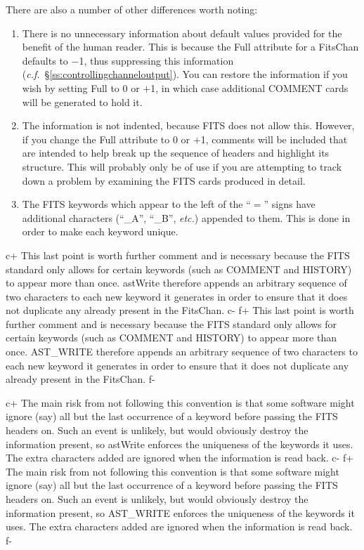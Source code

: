 \documentclass[twoside,11pt]{starlink}
\providecommand{\secref}[1]{\S\ref{#1}}
\begin{document}
{There are also a number of other differences worth noting:

\begin{enumerate}
\item There is no unnecessary information about default values
provided for the benefit of the human reader. This is because the Full
attribute for a FitsChan defaults to $-$1, thus suppressing this
information (\emph{c.f.}~\secref{ss:controllingchanneloutput}). You
can restore the information if you wish by setting Full to 0 or $+$1,
in which case additional COMMENT cards will be generated to hold it.

\item The information is not indented, because FITS does not allow
this. However, if you change the Full attribute to 0 or $+$1, comments
will be included that are intended to help break up the sequence of
headers and highlight its structure. This will probably only be of use
if you are attempting to track down a problem by examining the FITS
cards produced in detail.

\item The FITS keywords which appear to the left of the ``$=$'' signs
have additional characters (``\_A'', ``\_B'', \emph{etc.}) appended to
them. This is done in order to make each keyword unique.
\end{enumerate}

c+
This last point is worth further comment and is necessary because the
FITS standard only allows for certain keywords (such as COMMENT and
HISTORY) to appear more than once. astWrite therefore appends an
arbitrary sequence of two characters to each new keyword it generates
in order to ensure that it does not duplicate any already present in
the FitsChan.
c-
f+
This last point is worth further comment and is necessary because the
FITS standard only allows for certain keywords (such as COMMENT and
HISTORY) to appear more than once. AST\_WRITE therefore appends an
arbitrary sequence of two characters to each new keyword it generates
in order to ensure that it does not duplicate any already present in
the FitsChan.
f-

c+
The main risk from not following this convention is that some software
might ignore (say) all but the last occurrence of a keyword before
passing the FITS headers on. Such an event is unlikely, but would
obviously destroy the information present, so astWrite enforces the
uniqueness of the keywords it uses. The extra characters added are
ignored when the information is read back.
c-
f+
The main risk from not following this convention is that some software
might ignore (say) all but the last occurrence of a keyword before
passing the FITS headers on. Such an event is unlikely, but would
obviously destroy the information present, so AST\_WRITE enforces the
uniqueness of the keywords it uses. The extra characters added are
ignored when the information is read back.
f-

}
\end{document}
